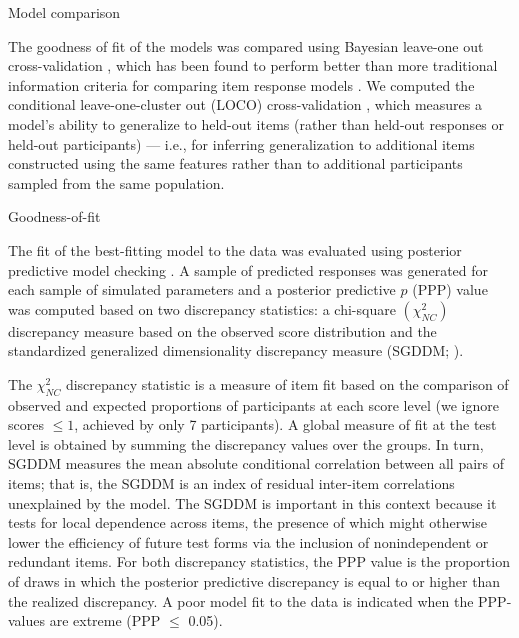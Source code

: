 \documentclass[a4paper,man,natbib]{apa6}
\makeatletter
\renewcommand{\subsubsection}{\@startsection{subsubsection}{3}
  {\z@}%
  {\b@level@two@skip}{\e@level@two@skip}%
  {\normalfont\normalsize\bfseries}}
\makeatother
\begin{document}
\subsubsection{Model comparison}

The goodness of fit of the models was compared using Bayesian leave-one out cross-validation \citep{vehtari2017practical}, which has been found to perform better than more traditional information criteria for comparing item response models \citep{luo2017performances}. We computed the conditional leave-one-cluster out (LOCO) cross-validation \citep{merkle2019bayesian}, which measures a model's ability to generalize to held-out items (rather than held-out responses or held-out participants) --- i.e., for inferring generalization to additional items constructed using the same features rather than to additional participants sampled from the same population.

\subsubsection{Goodness-of-fit}

The fit of the best-fitting model to the data was evaluated using posterior predictive model checking \citep{gelman1996posterior, levy2017bayesian}. A sample of predicted responses was generated for each sample of simulated parameters and a posterior predictive $p$ (PPP) value was computed based on two discrepancy statistics: a chi-square $\left( \chi^2_{NC} \right)$ discrepancy measure based on the observed score distribution \citep{sinharay2006posterior} and the standardized generalized dimensionality discrepancy measure (SGDDM; \citealt{levy2015standardized}). 

The $\chi^2_{NC}$ discrepancy statistic is a measure of item fit based on the comparison of observed and expected proportions of participants at each score level (we ignore scores $\leq 1$, achieved by only 7 participants). A global measure of fit at the test level is obtained by summing the discrepancy values over the groups. In turn, SGDDM measures the mean absolute conditional correlation between all pairs of items; that is, the SGDDM is an index of residual inter-item correlations unexplained by the model. The SGDDM is important in this context because it tests for local dependence across items, the presence of which might otherwise lower the efficiency of future test forms via the inclusion of nonindependent or redundant items. For both discrepancy statistics, the PPP value is the proportion of draws in which the posterior predictive discrepancy is equal to or higher than the realized discrepancy. A poor model fit to the data is indicated when the PPP-values are extreme (PPP $\leq$ 0.05).
\end{document}
